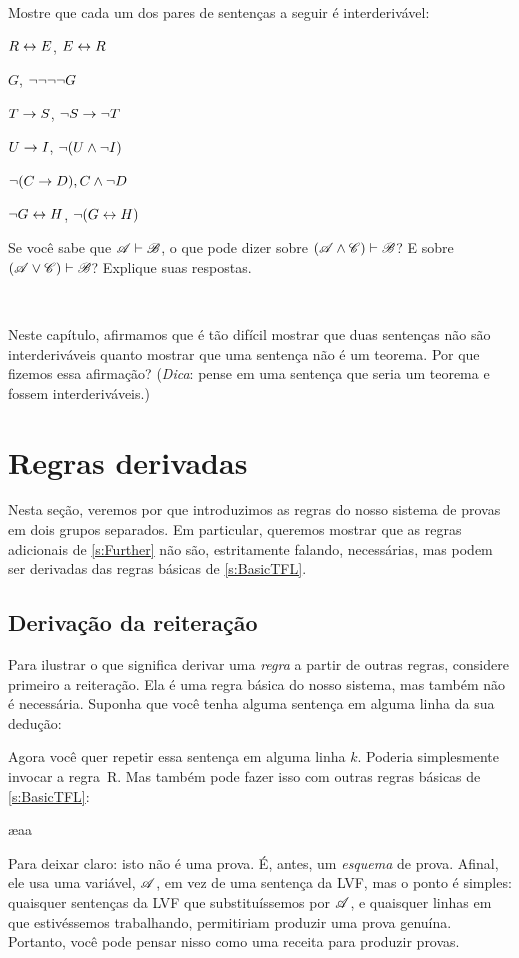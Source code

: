 \problempart
Mostre que cada um dos pares de sentenças a seguir é interderivável:
\begin{compactlist}
\item $R \leftrightarrow E$, $E \leftrightarrow R$
\item $G$, $\neg\neg\neg\neg G$
\item $T\rightarrow S$, $\neg S \rightarrow \neg T$
\item $U \rightarrow I$, $\neg(U \wedge \neg I)$
\item $\neg (C \rightarrow D), C \wedge \neg D$
\item $\neg G \leftrightarrow H$, $\neg(G \leftrightarrow H)$ 
\end{compactlist}

\problempart
Se você sabe que $\mathscr{A}\vdash\mathscr{B}$, o que pode dizer sobre $(\mathscr{A}\wedge\mathscr{C})\vdash\mathscr{B}$? E sobre $(\mathscr{A}\vee\mathscr{C})\vdash\mathscr{B}$? Explique suas respostas.

\

\problempart Neste capítulo, afirmamos que é tão difícil mostrar que duas sentenças não são interderiváveis quanto mostrar que uma sentença não é um teorema. Por que fizemos essa afirmação? (\emph{Dica}: pense em uma sentença que seria um teorema \ifeff{}  e  fossem interderiváveis.)


\chapter{Regras derivadas}\label{s:Derived}
Nesta seção, veremos por que introduzimos as regras do nosso sistema de provas em dois grupos separados. Em particular, queremos mostrar que as regras adicionais de \cref{s:Further} não são, estritamente falando, necessárias, mas podem ser derivadas das regras básicas de \cref{s:BasicTFL}.

\section{Derivação da reiteração}
Para ilustrar o que significa derivar uma \emph{regra} a partir de outras regras, considere primeiro a reiteração. Ela é uma regra básica do nosso sistema, mas também não é necessária. Suponha que você tenha alguma sentença em alguma linha da sua dedução:
\begin{fitchproof}
\end{fitchproof}
Agora você quer repetir essa sentença em alguma linha $k$. Poderia simplesmente invocar a regra~R. Mas também pode fazer isso com outras regras básicas de \cref{s:BasicTFL}:
\begin{fitchproof}
	\ae{aa}
\end{fitchproof}
Para deixar claro: isto não é uma prova. É, antes, um \emph{esquema} de prova. Afinal, ele usa uma variável, $\mathscr{A}$, em vez de uma sentença da LVF, mas o ponto é simples: quaisquer sentenças da LVF que substituíssemos por $\mathscr{A}$, e quaisquer linhas em que estivéssemos trabalhando, permitiriam produzir uma prova genuína. Portanto, você pode pensar nisso como uma receita para produzir provas.

